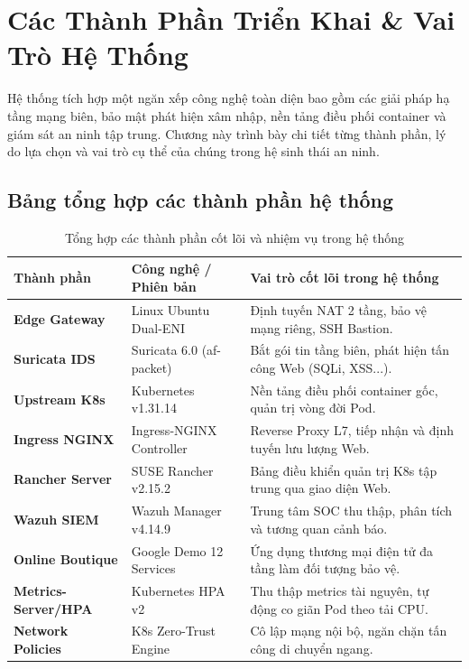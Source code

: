 \chapter{Các Thành Phần Triển Khai \& Vai Trò Hệ Thống}
\label{ch:components}

Hệ thống tích hợp một ngăn xếp công nghệ toàn diện bao gồm các giải pháp hạ tầng mạng biên, bảo mật phát hiện xâm nhập, nền tảng điều phối container và giám sát an ninh tập trung. Chương này trình bày chi tiết từng thành phần, lý do lựa chọn và vai trò cụ thể của chúng trong hệ sinh thái an ninh.

\section{Bảng tổng hợp các thành phần hệ thống}
\begin{table}[H]
    \centering
    \small
    \renewcommand{\arraystretch}{1.25}
    \caption{Tổng hợp các thành phần cốt lõi và nhiệm vụ trong hệ thống}
    \label{tab:components_summary}
    \begin{tabularx}{\textwidth}{l l X}
        \toprule
        \textbf{Thành phần} & \textbf{Công nghệ / Phiên bản} & \textbf{Vai trò cốt lõi trong hệ thống} \\
        \midrule
        \textbf{Edge Gateway} & Linux Ubuntu Dual-ENI & Định tuyến NAT 2 tầng, bảo vệ mạng riêng, SSH Bastion. \\
        \textbf{Suricata IDS} & Suricata 6.0 (af-packet) & Bắt gói tin tầng biên, phát hiện tấn công Web (SQLi, XSS...). \\
        \textbf{Upstream K8s} & Kubernetes v1.31.14 & Nền tảng điều phối container gốc, quản trị vòng đời Pod. \\
        \textbf{Ingress NGINX} & Ingress-NGINX Controller & Reverse Proxy L7, tiếp nhận và định tuyến lưu lượng Web. \\
        \textbf{Rancher Server} & SUSE Rancher v2.15.2 & Bảng điều khiển quản trị K8s tập trung qua giao diện Web. \\
        \textbf{Wazuh SIEM} & Wazuh Manager v4.14.9 & Trung tâm SOC thu thập, phân tích và tương quan cảnh báo. \\
        \textbf{Online Boutique} & Google Demo 12 Services & Ứng dụng thương mại điện tử đa tầng làm đối tượng bảo vệ. \\
        \textbf{Metrics-Server/HPA} & Kubernetes HPA v2 & Thu thập metrics tài nguyên, tự động co giãn Pod theo tải CPU. \\
        \textbf{Network Policies} & K8s Zero-Trust Engine & Cô lập mạng nội bộ, ngăn chặn tấn công di chuyển ngang. \\
        \bottomrule
    \end{tabularx}
\end{table}

